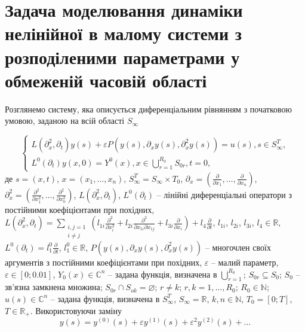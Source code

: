 \section{Задача моделювання динаміки нелінійної в малому системи з розподіленими параметрами у обмеженій
часовій області} \label{sec:sect2_2}

Розглянемо систему, яка описується диференціальним рівнянням з початковою умовою, заданою на всій області
$S_{\infty}$

\begin{equation}
    \label{eq:small_parameter_common_system_with_s_area}
    \left\{
    \begin{alignedat}{2}
    L(\partial_x^2, \partial_t)y(s) + \varepsilon P(y(s), \partial_x y(s), \partial_x^2 y(s)) = u(s), s\in S_\infty^T, \\
    L^{0}(\partial_{t})y(x,0) = Y^{0}(x),x\in\bigcup\limits_{r=1}^{R_{0}} S_{0r},t=0,
    \end{alignedat}
    \right.
\end{equation}
де $s=(x,t)$, $x=(x_{1},\dots,x_{n})$, $S_{\infty}^{T}=S_{\infty}\times T_{0}$, $\partial_{x}=\left(
\frac{\partial}{\partial x_{1}}, \dots, \frac{\partial}{\partial x_{n}} \right)$,
$\partial^{2}_{x}=\left(\frac{\partial^{2}}{\partial x^{2}_{1}}, \dots, \frac{\partial^{2}}{\partial x^{2}_{n}} \right)$,
$L(\partial_x^2, \partial_t)$, $L^{0}(\partial_{t})$ -- лінійні диференціальні оператори з постійними коефіцієнтами при похідних,
$
L(\partial_x^2, \partial_t)=\sum\limits_{ \substack{i,j=1\\ i\neq j}}\left(l_{1i} \frac{\partial^2}{\partial x^2_i} +
l_{2i}\frac{\partial^2}{\partial x_{1i}
    \partial x_{1j}} + l_{3i} \frac{\partial}{\partial x_i} \right) + l_4 \frac{\partial}{\partial t}
$, $l_{1i}$, $l_{2i}$, $l_{3i}$, $l_{4}\in\mathbb{R}$, $L^{0}(\partial_{t})=l_{1}^{0}\frac{\partial}{\partial t}$,
$l_{1}^{0}\in\mathbb{R}$, $P(y(s), \partial_x y(s), \partial_x^2 y(s))$ -- многочлен  своїх аргументів з постійними
коефіцієнтами при похідних,  $\varepsilon$ – малий параметр, $\varepsilon\in [0; 0.01]$,
$Y_{0}(x)\in\mathbb{C}^n$ -- задана функція, визначена в $\bigcup\limits_{r=1}^{R_{0}}$;
$S_{0r}\subseteq S_{0}$; $S_{0}$ -- зв'язна замкнена множина; $S_{0r}\cap S_{ok} = \varnothing$; $r\neq k$;
$r,k = 1,\dots,R_{0}$; $R_{0}\in\mathbb{N}$; $u(s)\in\mathbb{C}^n$ -- задана функція, визначена в
$S_{\infty}^{T}$, $S_{\infty} = \mathbb{R}$, $k,n\in\mathbb{N}$, $T_{0}=[0;T]$, $T\in\mathbb{R}_{+}$.
Використовуючи заміну
$$y(s)=y^{(0)}(s)+\varepsilon y^{(1)}(s) + \varepsilon^{2}y^{(2)}(s)+\dots$$
